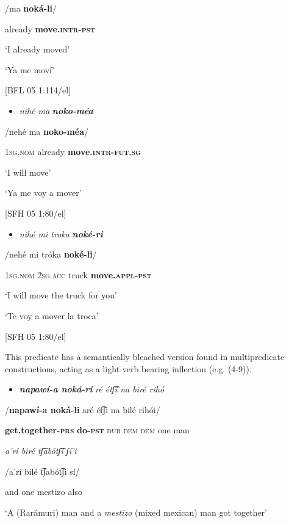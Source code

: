 /ma  \textbf{noká-li}/

  already  \textbf{move.\textsc{intr-pst}}

  ‘I already moved’

  ‘Ya me moví’

  [BFL 05 1:114/el] 

\begin{itemize}
\item \textit{nihé      ma} \textbf{\textit{noko-méa}} 
\end{itemize}

/nehé    ma    \textbf{noko-méa}/

  \textsc{1sg.nom}    already   \textbf{move\textsc{.intr-fut.sg}} 

    ‘I will move’  

  ‘Ya me voy a mover’    

   [SFH 05 1:80/el] 

\begin{itemize}
\item \textit{nihé      mi      troka} \textbf{\textit{noké-ri}}  
\end{itemize}

/nehé    mi    tróka  \textbf{noké-li}/

  1\textsc{sg.nom    2sg.acc}   truck  \textbf{move.\textsc{appl-pst}}   

  ‘I will move the truck for you’  

  ‘Te voy a mover la troca’    

  [SFH 05 1:80/el]  

This predicate has a semantically bleached version found in multipredicate constructions, acting as a light verb bearing inflection (e.g. (4-9)). 

\begin{itemize}
\item    \textbf{\textit{napawí-a     noká-ri}} \textit{ré   étʃ͡i   na   biré   rihó}  
\end{itemize}

    /\textbf{napawí-a    noká-li} aré ét͡ʃi  na  bilé  rihói/   

    \textbf{get.together-\textsc{prs}} \textbf{do-\textsc{pst}} \textsc{dub  dem  dem}  one  man

    \textit{a’rí   biré   tʃ͡abótʃ͡i     ʃí'i}

    /a’rí  bilé  t͡ʃabót͡ʃi  sí/

    and  one  mestizo  also

    ‘A (Rarámuri) man and a \textit{mestizo} (mixed mexican) man got together’

